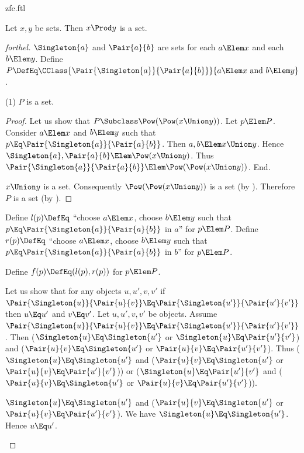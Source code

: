 \documentclass{stex}
\begin{document}
\begin{smodule}{zfc.ftl}
\begin{proposition*}[forthel]
  Let $x, y$ be sets.
  Then $x \Prod y$ is a set.
\end{proposition*}
\begin{proof}[forthel]
  $\Singleton{a}$ and $\Pair{a}{b}$ are sets for each $a \Elem x$ and each $b \Elem y$.
  Define $P \DefEq \CClass{\Pair{\Singleton{a}}{\Pair{a}{b}}}{a \Elem x\text{ and }b \Elem y}$.

  (1) $P$ is a set.
  \begin{proof}
    Let us show that $P \Subclass \Pow(\Pow(x \Union y))$.
      Let $p \Elem P$.
      Consider $a \Elem x$ and $b \Elem y$ such that $p \Eq \Pair{\Singleton{a}}{\Pair{a}{b}}$.
      Then $a, b \Elem x \Union y$.
      Hence $\Singleton{a}, \Pair{a}{b} \Elem \Pow(x \Union y)$.
      Thus $\Pair{\Singleton{a}}{\Pair{a}{b}} \Elem \Pow(\Pow(x \Union y))$.
    End.

    $x \Union y$ is a set.
    Consequently $\Pow(\Pow(x \Union y))$ is a set (by ).
    Therefore $P$ is a set (by ).
  \end{proof}

  Define $l(p) \DefEq$ ``choose $a \Elem x$, choose $b \Elem y$ such that $p \Eq \Pair{\Singleton{a}}{\Pair{a}{b}}$ in $a$'' for $p \Elem P$.
  Define $r(p) \DefEq$ ``choose $a \Elem x$, choose $b \Elem y$ such that $p \Eq \Pair{\Singleton{a}}{\Pair{a}{b}}$ in $b$'' for $p \Elem P$.

  Define $f(p) \DefEq (l(p), r(p))$ for $p \Elem P$.

  Let us show that for any objects $u, u', v, v'$ if
  $\Pair{\Singleton{u}}{\Pair{u}{v}} \Eq \Pair{\Singleton{u'}}{\Pair{u'}{v'}}$ then $u \Eq u'$ and $v \Eq v'$.
    Let $u, u', v, v'$ be objects.
    Assume $\Pair{\Singleton{u}}{\Pair{u}{v}} \Eq \Pair{\Singleton{u'}}{\Pair{u'}{v'}}$.
    Then ($\Singleton{u} \Eq \Singleton{u'}$ or $\Singleton{u} \Eq \Pair{u'}{v'}$) and ($\Pair{u}{v} \Eq \Singleton{u'}$ or $\Pair{u}{v} \Eq \Pair{u'}{v'}$).
    Thus ($\Singleton{u} \Eq \Singleton{u'}$ and ($\Pair{u}{v} \Eq \Singleton{u'}$ or $\Pair{u}{v} \Eq \Pair{u'}{v'}$)) or ($\Singleton{u} \Eq \Pair{u'}{v'}$ and ($\Pair{u}{v} \Eq \Singleton{u'}$ or $\Pair{u}{v} \Eq \Pair{u'}{v'}$)).

    \begin{case}{$\Singleton{u} \Eq \Singleton{u'}$ and ($\Pair{u}{v} \Eq \Singleton{u'}$ or $\Pair{u}{v} \Eq \Pair{u'}{v'}$).}
      We have $\Singleton{u} \Eq \Singleton{u'}$.
      Hence $u \Eq u'$.


\end{case}
\end{proof}
\end{smodule}
\end{document}
